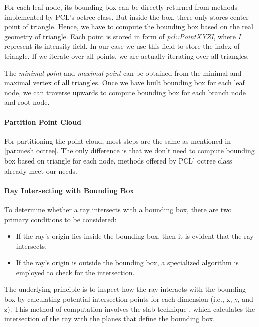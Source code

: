 \documentclass[11pt, a4paper,oneside,chapterprefix=false]{scrbook}
\begin{document}
For each leaf node, its bounding box can be directly returned from methods implemented by PCL's octree class. But inside the box, there only stores center point of triangle. Hence, we have to compute the bounding box based on the real geometry of triangle. Each point is stored in form of \emph{pcl::PointXYZI}, where \emph{I} represent its intensity field. In our case we use this field to store the index of triangle. If we iterate over all points, we are actually iterating over all triangles. 

\vspace{10pt}

The \emph{minimal point} and \emph{maximal point} can be obtained from the minimal and maximal vertex of all triangles. Once we have built bounding box for each leaf node, we can traverse upwards to compute bounding box for each branch node and root node. 

\paragraph{Partition Point Cloud}

For partitioning the point cloud, most steps are the same as mentioned in \ref{par:mesh octree}. The only difference is that we don't need to compute bounding box based on triangle for each node, methods offered by PCL' octree class already meet our needs.

\paragraph{Ray Intersecting with Bounding Box}

To determine whether a ray intersects with a bounding box, there are two primary conditions to be considered:

\begin{itemize}
    \item If the ray's origin lies inside the bounding box, then it is evident that the ray intersects.
    \item If the ray's origin is outside the bounding box, a specialized algorithm is employed to check for the intersection.
\end{itemize}

The underlying principle is to inspect how the ray interacts with the bounding box by calculating potential intersection points for each dimension (i.e., x, y, and z). This method of computation involves the slab technique \cite{scratchapixel_raybox}, which calculates the intersection of the ray with the planes that define the bounding box.
\end{document}
